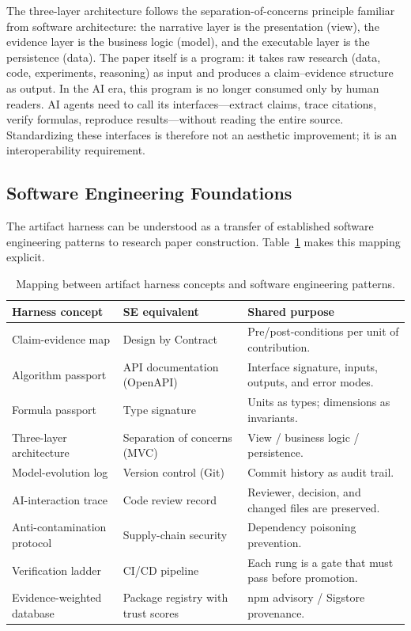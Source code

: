 \documentclass{article}
\begin{document}
The three-layer architecture follows the separation-of-concerns principle familiar from software architecture: the narrative layer is the presentation (view), the evidence layer is the business logic (model), and the executable layer is the persistence (data). The paper itself is a program: it takes raw research (data, code, experiments, reasoning) as input and produces a claim--evidence structure as output. In the AI era, this program is no longer consumed only by human readers. AI agents need to call its interfaces---extract claims, trace citations, verify formulas, reproduce results---without reading the entire source. Standardizing these interfaces is therefore not an aesthetic improvement; it is an interoperability requirement.

\subsection{Software Engineering Foundations}

The artifact harness can be understood as a transfer of established software engineering patterns to research paper construction. Table~\ref{tab:se_mapping} makes this mapping explicit.

\begin{table}[t]
\caption{Mapping between artifact harness concepts and software engineering patterns.}
\centering
\small
\begin{tabular}{p{3.6cm}p{3.6cm}p{5.5cm}}
\toprule
\textbf{Harness concept} & \textbf{SE equivalent} & \textbf{Shared purpose} \\
\midrule
Claim-evidence map & Design by Contract & Pre/post-conditions per unit of contribution. \\
Algorithm passport & API documentation (OpenAPI) & Interface signature, inputs, outputs, and error modes. \\
Formula passport & Type signature & Units as types; dimensions as invariants. \\
Three-layer architecture & Separation of concerns (MVC) & View / business logic / persistence. \\
Model-evolution log & Version control (Git) & Commit history as audit trail. \\
AI-interaction trace & Code review record & Reviewer, decision, and changed files are preserved. \\
Anti-contamination protocol & Supply-chain security & Dependency poisoning prevention. \\
Verification ladder & CI/CD pipeline & Each rung is a gate that must pass before promotion. \\
Evidence-weighted database & Package registry with trust scores & npm advisory / Sigstore provenance. \\
\bottomrule
\end{tabular}
\label{tab:se_mapping}
\end{table}
\end{document}
